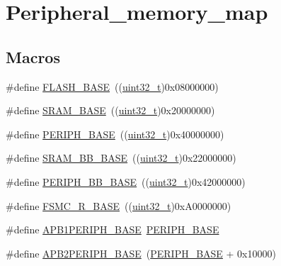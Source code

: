 \hypertarget{group___peripheral__memory__map}{}\section{Peripheral\+\_\+memory\+\_\+map}
\label{group___peripheral__memory__map}
\subsection*{Macros}
\begin{DoxyCompactItemize}
\item 
\#define \hyperlink{group___peripheral__memory__map_ga23a9099a5f8fc9c6e253c0eecb2be8db}{F\+L\+A\+S\+H\+\_\+\+B\+A\+SE}~((\hyperlink{_p_e___types_8h_a33594304e786b158f3fb30289278f5af}{uint32\+\_\+t})0x08000000)
\item 
\#define \hyperlink{group___peripheral__memory__map_ga05e8f3d2e5868754a7cd88614955aecc}{S\+R\+A\+M\+\_\+\+B\+A\+SE}~((\hyperlink{_p_e___types_8h_a33594304e786b158f3fb30289278f5af}{uint32\+\_\+t})0x20000000)
\item 
\#define \hyperlink{group___peripheral__memory__map_ga9171f49478fa86d932f89e78e73b88b0}{P\+E\+R\+I\+P\+H\+\_\+\+B\+A\+SE}~((\hyperlink{_p_e___types_8h_a33594304e786b158f3fb30289278f5af}{uint32\+\_\+t})0x40000000)
\item 
\#define \hyperlink{group___peripheral__memory__map_gad3548b6e2f017f39d399358f3ac98454}{S\+R\+A\+M\+\_\+\+B\+B\+\_\+\+B\+A\+SE}~((\hyperlink{_p_e___types_8h_a33594304e786b158f3fb30289278f5af}{uint32\+\_\+t})0x22000000)
\item 
\#define \hyperlink{group___peripheral__memory__map_gaed7efc100877000845c236ccdc9e144a}{P\+E\+R\+I\+P\+H\+\_\+\+B\+B\+\_\+\+B\+A\+SE}~((\hyperlink{_p_e___types_8h_a33594304e786b158f3fb30289278f5af}{uint32\+\_\+t})0x42000000)
\item 
\#define \hyperlink{group___peripheral__memory__map_gaddf0e199dccba83272b20c9fb4d3aaed}{F\+S\+M\+C\+\_\+\+R\+\_\+\+B\+A\+SE}~((\hyperlink{_p_e___types_8h_a33594304e786b158f3fb30289278f5af}{uint32\+\_\+t})0x\+A0000000)
\item 
\#define \hyperlink{group___peripheral__memory__map_ga45666d911f39addd4c8c0a0ac3388cfb}{A\+P\+B1\+P\+E\+R\+I\+P\+H\+\_\+\+B\+A\+SE}~\hyperlink{openmotestm_2library_2inc_2stm32f10x__map_8h_a9171f49478fa86d932f89e78e73b88b0}{P\+E\+R\+I\+P\+H\+\_\+\+B\+A\+SE}
\item 
\#define \hyperlink{group___peripheral__memory__map_ga25b99d6065f1c8f751e78f43ade652cb}{A\+P\+B2\+P\+E\+R\+I\+P\+H\+\_\+\+B\+A\+SE}~(\hyperlink{openmotestm_2library_2inc_2stm32f10x__map_8h_a9171f49478fa86d932f89e78e73b88b0}{P\+E\+R\+I\+P\+H\+\_\+\+B\+A\+SE} + 0x10000)

\end{DoxyCompactItemize}
